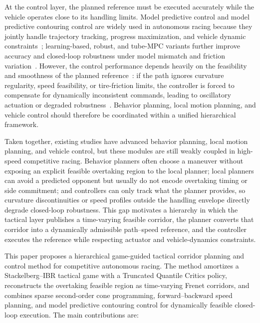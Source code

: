 \documentclass{iopjournal}
\begin{document}
At the control layer, the planned reference must be executed accurately while
the vehicle operates close to its handling limits. Model predictive control and
model predictive contouring control are widely used in autonomous racing because
they jointly handle trajectory tracking, progress maximization, and vehicle
dynamic constraints~\cite{liniger2015optimization,liniger2019game,rosolia2020learning,
kabzan2019learning,brunner2017repetitive,novi2020realtime}; learning-based,
robust, and tube-MPC variants further improve accuracy and closed-loop
robustness under model mismatch and friction variation~\cite{rosolia2018lmpc,
hewing2020learning,wischnewski2023tube,brunke2022safelearning,he2021parallelized}.
However, the control performance depends heavily on the feasibility and
smoothness of the planned reference~\cite{betz2022software,betz2023autonomous}:
if the path ignores curvature regularity, speed feasibility, or tire-friction
limits, the controller is forced to compensate for dynamically inconsistent
commands, leading to oscillatory actuation or degraded robustness~\cite{verschueren2014nmpc}.
Behavior planning, local motion planning, and vehicle control should therefore
be coordinated within a unified hierarchical framework.




Taken together, existing studies have advanced behavior planning, local motion
planning, and vehicle control, but these modules are still weakly coupled in
high-speed competitive racing.  Behavior planners often choose a maneuver
without exposing an explicit feasible overtaking region to the local planner;
local planners can avoid a predicted opponent but usually do not encode
overtaking timing or side commitment; and controllers can only track what the
planner provides, so curvature discontinuities or speed profiles outside the
handling envelope directly degrade closed-loop robustness.  This gap motivates
a hierarchy in which the tactical layer publishes a time-varying feasible
corridor, the planner converts that corridor into a dynamically admissible
path--speed reference, and the controller executes the reference while
respecting actuator and vehicle-dynamics constraints.



This paper proposes a hierarchical game-guided tactical corridor planning and
control method for competitive autonomous racing.  The method amortizes a
Stackelberg--IBR tactical game with a Truncated Quantile Critics policy,
reconstructs the overtaking feasible region as time-varying Frenet corridors,
and combines sparse second-order cone programming, forward--backward speed
planning, and model predictive contouring control for dynamically feasible
closed-loop execution.  The main contributions are:
\end{document}
